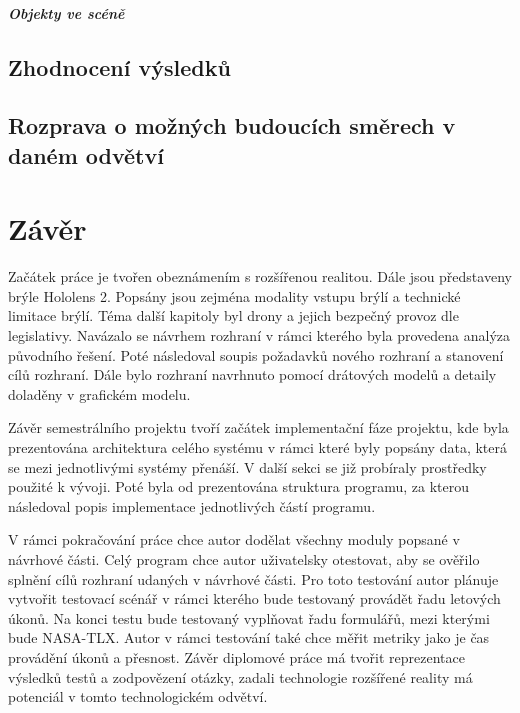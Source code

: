 \paragraph{Objekty ve scéně}
\section{Zhodnocení výsledků}
\section{Rozprava o možných budoucích směrech v daném odvětví}
\chapter{Závěr}
Začátek práce je tvořen obeznámením s rozšířenou realitou. Dále jsou představeny brýle Hololens 2. Popsány jsou zejména modality vstupu brýlí a technické limitace brýlí. Téma další kapitoly byl drony a jejich bezpečný provoz dle legislativy. Navázalo se návrhem rozhraní v rámci kterého byla provedena analýza původního řešení. Poté následoval soupis požadavků nového rozhraní a stanovení cílů rozhraní. Dále bylo rozhraní navrhnuto pomocí drátových modelů a detaily doladěny v grafickém modelu. 

Závěr semestrálního projektu tvoří začátek implementační fáze projektu, kde byla prezentována architektura celého systému v rámci které byly popsány data, která se mezi jednotlivými systémy přenáší. V další sekci se již probíraly prostředky použité k vývoji. Poté byla od prezentována struktura programu, za kterou následoval popis implementace jednotlivých částí programu. 

V rámci pokračování práce chce autor dodělat všechny moduly popsané v návrhové části. Celý program chce autor uživatelsky otestovat, aby se ověřilo splnění cílů rozhraní udaných v návrhové části. Pro toto testování autor plánuje vytvořit testovací scénář v rámci kterého bude testovaný provádět řadu letových úkonů. Na konci testu bude testovaný vyplňovat řadu formulářů, mezi kterými bude NASA-TLX. Autor v rámci testování také chce měřit metriky jako je čas provádění úkonů a přesnost. Závěr diplomové práce má tvořit reprezentace výsledků testů a zodpovězení otázky, zadali technologie rozšířené reality má potenciál v tomto technologickém odvětví.
